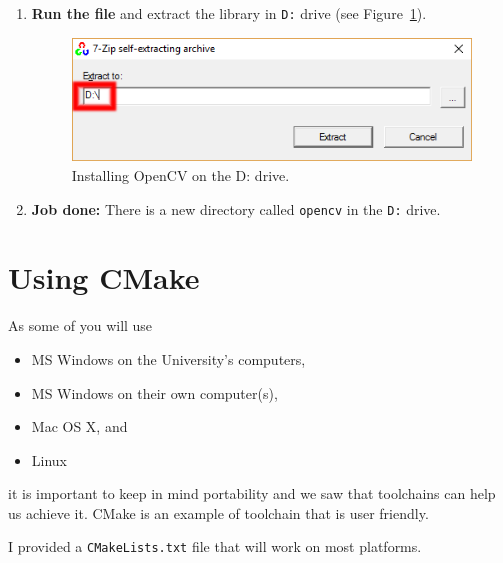 \documentclass[english,a4paper,12pt,oneside]{article}
\begin{document}
\begin{itemize}
\begin{enumerate}
	\item \textbf{Run the file} and extract the library in \verb+D:+ drive (see Figure~\ref{fig:d drive}). 
	\begin{figure}[tbp]
		\includegraphics[width=\textwidth]{D_drive.png}
		\caption{\label{fig:d drive}Installing OpenCV on the D: drive.}
	\end{figure}

	\item \textbf{Job done:} There is a new directory called \verb+opencv+ in the \verb+D:+ drive.  
		 \end{enumerate}
\end{itemize}



\newpage


\section{Using CMake}

As some of you will use
\begin{itemize}
 \item MS Windows on the University's computers,
 \item MS Windows on their own computer(s),
 \item Mac OS X, and
 \item Linux
\end{itemize}
it is important to keep in mind portability and we saw that toolchains can help us achieve it. 
CMake is an example of toolchain that is user friendly. 

I provided a \verb+CMakeLists.txt+ file that will work on most platforms. 

\end{document}
